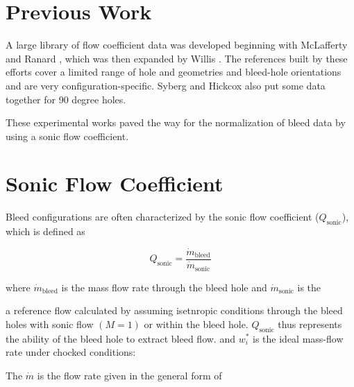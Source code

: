\documentclass{article}
\newcommand{\sfrac}[2]{\textstyle\frac{#1}{#2}}
\newcommand{\mdot}{\dot{m}}
\newcommand{\trm}[1]{\textrm{#1}}
\begin{document}
\section{Previous Work}



A large library of flow coefficient data was developed beginning with McLafferty and Ranard \cite{McLafferty1958}, which was then expanded by Willis \cite{Willis1995}. The references built by these efforts cover a limited range of hole and geometries and bleed-hole orientations and are very configuration-specific. Syberg and Hickcox \cite{Syberg1973b} also put some data together for 90 degree holes.

These experimental works paved the way for the normalization of bleed data by using a sonic flow coefficient.

\section{Sonic Flow Coefficient}

Bleed configurations are often characterized by the sonic flow coefficient ($Q_\textrm{sonic}$), which is defined as

$$ Q_\trm{sonic} = \frac{\mdot_\trm{bleed}}{\mdot_\trm{sonic}} $$

where $\mdot_\trm{bleed}$ is the mass flow rate through the bleed hole and $\mdot_\trm{sonic}$ is the 

a reference flow calculated by assuming isetnropic conditions through the bleed holes with sonic flow $(M=1)$ or within the bleed hole. $Q_\trm{sonic}$ thus represents the ability of the bleed hole to extract bleed flow.
and $w_i^*$ is the ideal mass-flow rate under chocked conditions:

The $\mdot$ is the flow rate given in the general form of

\end{document}
